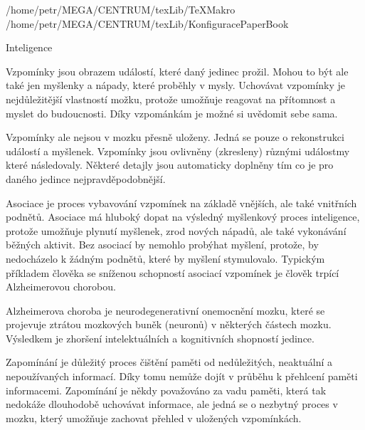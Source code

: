 \def\addr{/home/petr/MEGA/CENTRUM/texLib}

 \addr/TeXMakro
\setAddress{\addr}
 \addr/KonfiguracePaperBook





Inteligence




Vzpomínky jsou obrazem událostí, které daný jedinec prožil. Mohou to být ale také jen myšlenky a nápady, které proběhly v mysly. Uchovávat vzpomínky je nejdůležitější vlastností možku, protože umožňuje reagovat na přítomnost a myslet do budoucnosti. Díky vzpománkám je možné si uvědomit sebe sama. 

Vzpomínky ale nejsou v mozku přesně uloženy. Jedná se pouze o rekonstrukci událostí a myšlenek. Vzpomínky jsou ovlivněny (zkresleny) různými událostmy které následovaly. Některé detajly jsou automaticky doplněny tím co je pro daného jedince nejpravděpodobnější. 



Asociace je proces vybavování vzpomínek na základě vnějších, ale také vnitřních podnětů. Asociace má hluboký dopat na výsledný myšlenkový proces inteligence, protože umožňuje plynutí myšlenek, zrod nových nápadů, ale také vykonávání běžných aktivit. Bez asociací by nemohlo probýhat myšlení, protože, by nedocházelo k žádným podnětů, které by myšlení stymulovalo. Typickým příkladem člověka se sníženou schopností asociací vzpomínek je člověk trpící Alzheimerovou chorobou.

Alzheimerova choroba je neurodegenerativní onemocnění mozku, které se projevuje ztrátou mozkových buněk (neuronů) v některých částech mozku. Výsledkem je zhoršení intelektuálních a kognitivních shopností jedince. 




Zapomínání je důležitý proces čištění paměti od nedůležitých, neaktuální a nepoužívaných informací. Díky tomu nemůže dojít v průběhu k přehlcení paměti informacemi. Zapomínání je někdy považováno za vadu paměti, která tak nedokáže dlouhodobě uchovávat informace, ale jedná se o nezbytný proces v mozku, který umožňuje zachovat přehled v uložených vzpomínkách. 

